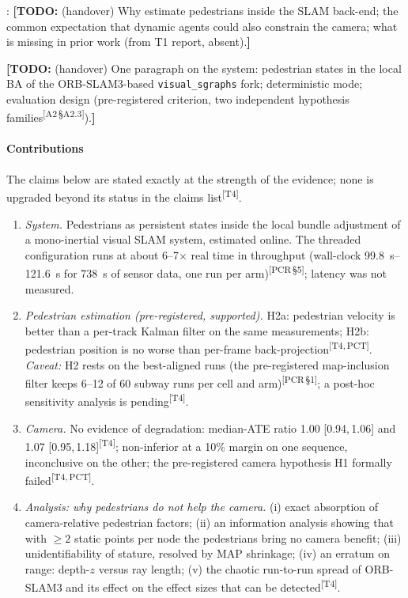 \documentclass[journal]{IEEEtran}
\newcommand{\TODO}[1]{{\color{red}\textbf{[TODO:} #1\textbf{]}}}
\newcommand{\src}[1]{\textsuperscript{\color{blue}\scriptsize[#1]}}
\begin{document}
: \TODO{(handover) Why estimate pedestrians
inside the SLAM back-end; the common expectation that dynamic agents
could also constrain the camera; what is missing in prior work (from T1 report,
absent).}

\TODO{(handover) One paragraph on the system: pedestrian states in the local
BA of the ORB-SLAM3-based \texttt{visual\_sgraphs} fork; deterministic mode;
evaluation design (pre-registered criterion, two independent hypothesis
families\src{A2\,\S A2.3}).}

\paragraph*{Contributions}
The claims below are stated exactly at the strength of the evidence; none is
upgraded beyond its status in the claims list\src{T4}.
\begin{enumerate}
  \item \emph{System.} Pedestrians as persistent states inside the local bundle
  adjustment of a mono-inertial visual SLAM system, estimated online.
  The threaded configuration runs at about 6--7$\times$ real time in
  throughput (wall-clock \SIrange{99.8}{121.6}{\second} for
  \SI{738}{\second} of sensor data, one run per arm)\src{PCR\,\S5};
  latency was not measured.
  \item \emph{Pedestrian estimation (pre-registered, supported).}
  H2a: pedestrian velocity is better than a per-track Kalman filter on the same
  measurements; H2b: pedestrian position is no worse than per-frame
  back-projection\src{T4,\,PCT}. \emph{Caveat:} H2 rests on the best-aligned
  runs (the pre-registered map-inclusion filter keeps 6--12 of 60 subway runs
  per cell and arm)\src{PCR\,\S1}; a post-hoc sensitivity analysis is
  pending\src{T4}.
  \item \emph{Camera.} No evidence of degradation: median-ATE ratio
  1.00 [0.94,\,1.06] and 1.07 [0.95,\,1.18]\src{T4}; non-inferior at a 10\%
  margin on one sequence, inconclusive on the other; the pre-registered
  camera hypothesis H1 formally failed\src{T4,\,PCT}.
  \item \emph{Analysis: why pedestrians do not help the camera.}
  (i) exact absorption of camera-relative pedestrian factors;
  (ii) an information analysis showing that with $\geq 2$ static points per
  node the pedestrians bring no camera benefit;
  (iii) unidentifiability of stature, resolved by MAP shrinkage;
  (iv) an erratum on range: depth-$z$ versus ray length;
  (v) the chaotic run-to-run spread of ORB-SLAM3 and its effect on the effect
  sizes that can be detected\src{T4}.
\end{enumerate}
\end{document}

